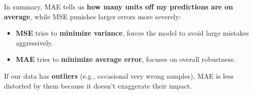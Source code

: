 \begin{deepeningbox}
    \highspace
    In summary, MAE tells us \textbf{how many units off my predictions are on average}, while MSE punishes larger errors more severely:
    \begin{itemize}
        \item \textbf{MSE} tries to \textbf{minimize variance}, forces the model to avoid large mistakes aggressively.
        \item \textbf{MAE} tries to \textbf{minimize average error}, focuses on overall robustness.
    \end{itemize}
    If our data has \textbf{outliers} (e.g., occasional very wrong samples), MAE is less distorted by them because it doesn't exaggerate their impact.
\end{deepeningbox}
